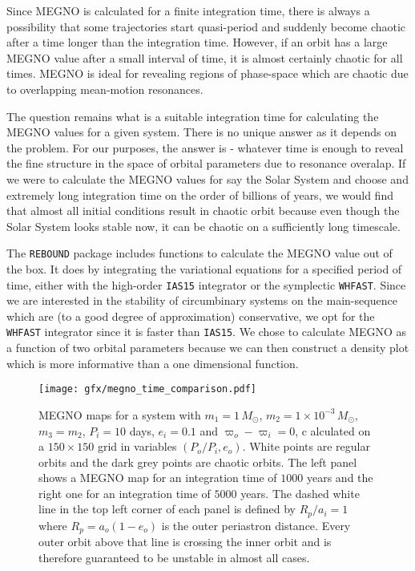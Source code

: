 \documentclass[ twoside,openright,titlepage,numbers=noenddot,headinclude,%
                footinclude=true,cleardoublepage=empty,abstractoff, %
                BCOR=5mm,paper=a4,fontsize=11pt,%
                american,%
                ]{scrreprt}
\begin{document}
Since MEGNO is calculated for a finite integration
time, there
is always a possibility that some trajectories start quasi-period and suddenly
become chaotic after a time longer than the integration time. However, if an orbit
has a large MEGNO value after a small interval of time, it 
is almost certainly chaotic for all times. MEGNO is ideal for revealing 
regions of phase-space which are chaotic due to overlapping mean-motion resonances.

The question remains what is a suitable integration time for calculating the 
MEGNO values for a given system. There is no unique answer as it depends on 
the problem. For our purposes, the answer is  - whatever time is enough 
to reveal the fine structure in the space of orbital parameters 
due to resonance overalap. If we were to calculate the MEGNO values
for say the Solar System and choose and extremely long integration time
on the order of billions of years, we would find that almost all initial
conditions result in chaotic orbit because even though the Solar System looks
stable now, it can be chaotic on a sufficiently long timescale.

The \texttt{REBOUND} package includes functions to calculate
the MEGNO value out of the box. It does by integrating the variational equations
for a specified period of time, either with the high-order \texttt{IAS15} 
integrator or the symplectic \texttt{WHFAST}. Since we are interested
in the stability of circumbinary systems on the main-sequence which are
(to a good degree of approximation) conservative, we opt for the 
\texttt{WHFAST} integrator since it is faster than \texttt{IAS15}. We chose
to calculate MEGNO as a function of two orbital parameters because we can 
then construct a density plot which is more informative than a one 
dimensional function.
\begin{figure}[htb]
\centering
\texttt{[image: gfx/megno\_time\_comparison.pdf]}
\caption{MEGNO maps for a system with 
    $m_1=1\,M_\odot$, $m_2=1\times 10^{-3}\,M_\odot$, $m_3=m_2$,
    $P_i=10$ days, $e_i=0.1$ and $\varpi_o-\varpi_i=0$, c
    alculated on a $150\times 150$
    grid in variables $(P_o/P_i,e_o)$. White points are regular orbits
    and the dark grey points are chaotic orbits. The left panel
    shows a MEGNO map for an integration time of $1000$ years and the
    right one for an integration time of $5000$ years. The dashed white line in
    the top left corner of each panel is defined 
    by $R_p/a_i=1$ where $R_p=a_o(1-e_o)$
    is the outer periastron distance. Every outer orbit above that line
    is crossing the inner orbit and is therefore guaranteed to be 
    unstable in almost all cases.}
\label{fig:megno_example}
\end{figure}
\end{document}
